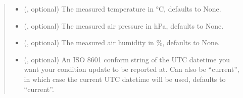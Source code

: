 \documentclass[letterpaper,10pt,english]{sphinxmanual}
\begin{document}
\begin{fulllineitems}
\begin{fulllineitems}
\begin{quote}
\begin{description}
\begin{itemize}
\item {} 
\sphinxAtStartPar
{} (, optional) \textendash{} The measured temperature in °C, defaults to None.

\item {} 
\sphinxAtStartPar
{} (, optional) \textendash{} The measured air pressure in hPa, defaults to None.

\item {} 
\sphinxAtStartPar
{} (, optional) \textendash{} The measured air humidity in \%, defaults to None.

\item {} 
\sphinxAtStartPar
{} (, optional) \textendash{} An ISO 8601 conform string of the UTC datetime you want your
condition update to be reported at. Can also be “current”, in which
case the current UTC datetime will be used, defaults to “current”.

\end{itemize}

\end{description}\end{quote}

\end{fulllineitems}


\end{fulllineitems}

\end{document}
